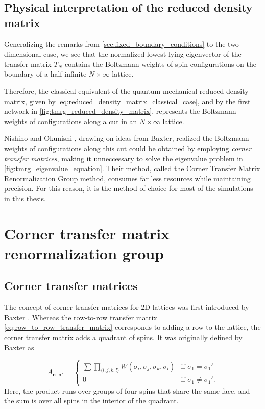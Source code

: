 \subsection{Physical interpretation of the reduced density matrix}
Generalizing the remarks from \autoref{sec:fixed_boundary_conditions} to the
two-dimensional case, we see that the normalized lowest-lying eigenvector of the transfer
matrix $T_N$ contains the Boltzmann weights of spin configurations on the boundary of a
half-infinite $N \times \infty$ lattice.

Therefore, the classical equivalent of the quantum mechanical reduced density matrix,
given by \autoref{eq:reduced_density_matrix_classical_case}, and by the first network in
\autoref{fig:tmrg_reduced_density_matrix}, represents the Boltzmann weights of
configurations along a cut in an $N \times \infty$ lattice.

Nishino and Okunishi \cite{nishino1996corner}, drawing on ideas from Baxter, realized the
Boltzmann weights of configurations along this cut could be obtained by employing
\textit{corner transfer matrices}, making it unneccessary to solve the eigenvalue problem
in \autoref{fig:tmrg_eigenvalue_equation}. Their method, called the Corner Transfer Matrix
Renormalization Group method, consumes far less resources while maintaining precision. For
this reason, it is the method of choice for most of the simulations in this thesis.


\section{Corner transfer matrix renormalization group}
\subsection{Corner transfer matrices}

The concept of corner transfer matrices for 2D lattices was first introduced by
Baxter \cite{baxter1968dimers, baxter1978variational, baxter1982exactly}.
Whereas the row-to-row transfer matrix \autoref{eq:row_to_row_transfer_matrix}
corresponds to adding a row to the lattice, the corner transfer matrix adds
a quadrant of spins. It was originally defined by Baxter as

\begin{equation}\label{eq:corner_transfer_matrix}
  A_{\bm{\sigma}, \bm{\sigma'}} =
  \begin{cases}
    \sum \prod_{\langle i, j, k, l \rangle} W(\sigma_i, \sigma_j, \sigma_k, \sigma_l) & \text{if } \sigma_{1} = \sigma_{1}' \\
    0 & \text{if } \sigma_{1} \neq \sigma_{1}'.
  \end{cases}
\end{equation}
Here, the product runs over groups of four spins that share the same face, and
the sum is over all spins in the interior of the quadrant.

